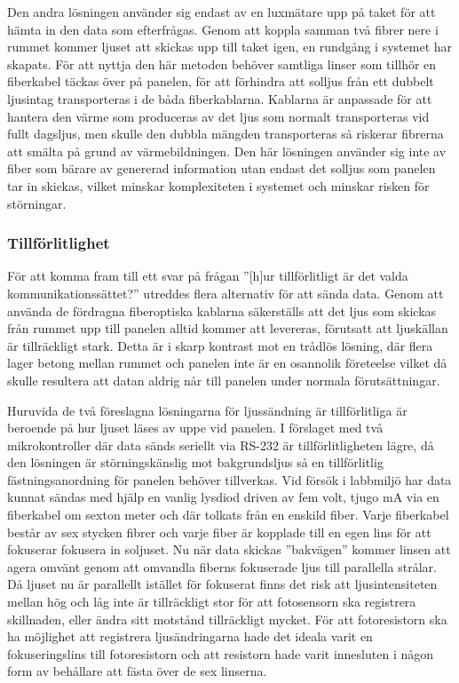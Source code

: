             Den andra lösningen använder sig endast av en luxmätare upp på taket för att hämta in den data som efterfrågas. Genom att koppla samman två fibrer nere i rummet kommer ljuset att skickas upp till taket igen, en rundgång i systemet har skapats. För att nyttja den här metoden behöver samtliga linser som tillhör en fiberkabel täckas över på panelen, för att förhindra att solljus från ett dubbelt ljusintag transporteras i de båda fiberkablarna. Kablarna är anpassade för att hantera den värme som produceras av det ljus som normalt transporteras vid fullt dagsljus, men skulle den dubbla mängden transporteras så riskerar fibrerna att smälta på grund av värmebildningen. Den här lösningen använder sig inte av fiber som bärare av genererad information utan endast det solljus som panelen tar in skickas, vilket minskar komplexiteten i systemet och minskar risken för störningar. 

        \subsubsection{Tillförlitlighet} %
        \label{sub:tillf_rlitlighet}
            För att komma fram till ett svar på frågan ''[h]ur tillförlitligt är det valda kommunikationssättet?'' utreddes flera alternativ för att sända data. Genom att använda de fördragna fiberoptiska kablarna säkerställs att det ljus som skickas från rummet upp till panelen alltid kommer att levereras, förutsatt att ljuskällan är tillräckligt stark. Detta är i skarp kontrast mot en trådlös lösning, där flera lager betong mellan rummet och panelen inte är en osannolik företeelse vilket då skulle resultera att datan aldrig når till panelen under normala förutsättningar. \bigskip

            Huruvida de två föreslagna lösningarna för ljussändning är tillförlitliga är beroende på hur ljuset läses av uppe vid panelen. I förslaget med två mikrokontroller där data sänds seriellt via RS-232 är tillförlitligheten lägre, då den lösningen är störningskänslig mot bakgrundsljus så en tillförlitlig fästningsanordning för panelen behöver tillverkas. Vid försök i labbmiljö har data kunnat sändas med hjälp en vanlig lysdiod driven av fem volt, tjugo mA via en fiberkabel om sexton meter och där tolkats från en enskild fiber. Varje fiberkabel består av sex stycken fibrer och varje fiber är kopplade till en egen lins för att fokuserar fokusera in soljuset. Nu när data skickas ''bakvägen'' kommer linsen att agera omvänt genom att omvandla fiberns fokuserade ljus till parallella strålar. Då ljuset nu är parallellt istället för fokuserat finns det risk att ljusintensiteten mellan hög och låg inte är tillräckligt stor för att fotosensorn ska registrera skillnaden, eller ändra sitt motstånd tillräckligt mycket. För att fotoresistorn ska ha möjlighet att registrera ljusändringarna hade det ideala varit en fokuseringslins till fotoresistorn och att resistorn hade varit innesluten i någon form av behållare att fästa över de sex linserna. \bigskip


